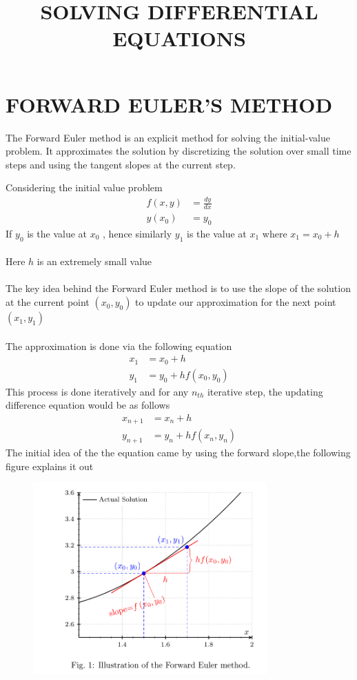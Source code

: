 \documentclass{article}
\title{SOLVING DIFFERENTIAL EQUATIONS}
\author{}
\date{}
\begin{document}
\maketitle

\section*{FORWARD EULER'S METHOD}

The Forward Euler method is an explicit method for solving the initial-value problem. It approximates the solution by discretizing
the solution over small time steps and using the tangent slopes at the current step.

Considering the initial value problem
\begin{align*}
    f(x,y) &= \frac{dy}{dx} \\
    y(x_0) &= y_0    
\end{align*}
If $y_0$  is the value at $x_0$ , hence similarly $y_1$ is the value 
at $x_1$ where $x_1=x_0 + h$ \\
\\
Here $h$ is an extremely small value \\
\\
The key idea behind the Forward Euler method is to use the slope of the solution at the current point $(x_0, y_0)$ to update our approximation for the next point $(x_1, y_1)$ \\
\\
The approximation is done via the following equation
\begin{align*}
    x_1 &= x_0 + h \\ 
    y_1 &= y_0 + hf(x_0,y_0)
\end{align*}
This process is done iteratively and for any $n_{th}$ iterative step, the updating difference equation would be as follows  
\begin{align*}
    x_{n+1} &= x_n + h \\ 
    y_{n+1} &= y_n + hf(x_n,y_n)
\end{align*}
The initial idea of the the equation came by using the forward slope,the following figure explains it out 
\begin{figure}[h!] %
  \centering
  \includegraphics[width=0.8\textwidth]{fig1.png}
\end{figure}
\end{document}
